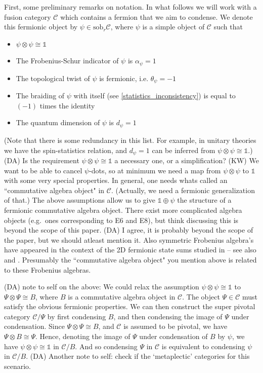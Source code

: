 \documentclass[12pt,a4paper]{article}
\newcommand{\tp}{\otimes}
\newcommand{\unit}{\mathds{1}}
\newcommand{\mcc}{\mathcal{C}}
\newcommand{\sob}{\text{sob}_r}
\newcommand{\ot}{\otimes}
\newcommand{\kw}[1]{{\color{kwcolor}\footnotesize{(KW) #1}}}
\newcommand{\dave}[1]{{\color{ao(english)}\footnotesize{(DA) #1}}}
\begin{document}
First, some preliminary remarks on notation. 
In what follows we will work with a fusion category $\mathcal{C}$ which contains a fermion that we aim to condense. 
We denote this fermionic object by $\psi \in \sob\mcc$, 
where $\psi$ is a simple object of $\mcc$ such that
\begin{itemize} 
	\item $\psi\ot\psi\cong\unit$
	\item The Frobenius-Schur indicator of $\psi$ is $\alpha_\psi =1$
	\item The topological twist of $\psi$ is fermionic, i.e. $\theta_\psi =-1$
	\item The braiding of $\psi$ with itself (see \eqref{statistics_inconsistency}) is equal to $(-1)$ times the identity
	\item The quantum dimension of $\psi$ is $d_\psi=1$
\end{itemize}
(Note that there is some redundancy in this list.
For example, 
in unitary theories we have the spin-statistics relation, and $d_\psi=1$ can be inferred from $\psi\tp\psi \cong \unit$.)
\dave{Is the requirement $\psi \tp \psi \cong \unit$ a necessary one, or a simplification?}
\kw{We want to be able to cancel $\psi$-dots, so at minimum we need a map from $\psi\tp\psi$ to $\unit$ with some very special properties.
In general, one needs whats called an ``commutative algebra object" in $\mcc$.
(Actually, we need a fermionic generalization of that.)
The above assumptions allow us to give $\unit\oplus\psi$ the structure of a fermionic commutative algebra object.
There exist more complicated algebra objects (e.g.\ ones corresponding to E6 and E8),
but think discussing this is beyond the scope of this paper.}
\dave{
I agree, it is probably beyond the scope of the paper, but we should atleast mention it.
Also symmetric Frobenius algebra's have appeared in the context of the 2D fermionic state sums studied in \cite{turzillo2016} -- see also \cite{novak2015b} and \cite{Novak2015,Barrett2015}.
Presumably the ``commutative algebra object" you mention above is related to these Frobenius algebras.
}

\dave{note to self on the above: 
We could relax the assumption $\psi \tp \psi \cong \unit$ to $\Psi \tp \Psi \cong B$, 
where $B$ is a commutative algebra object in $\mcc$. 
The object $\Psi \in \mcc $ must satisfy the obvious fermionic properties.
We can then construct the super pivotal category $\mcc/\Psi$ by first condensing $B$, and then condensing the image of $\Psi$ under condensation.
Since $\Psi \tp \Psi \cong B$, and $\mcc$ is assumed to be pivotal, we have $\Psi \tp B \cong \Psi$. 
Hence, denoting the image of $\Psi$ under condensation of $B$ by $\psi$, 
we have $\psi \tp \psi \cong \unit$ in $\mcc/B$.
And so condensing $\Psi$ in $\mcc$ is equivalent to condensing $\psi$ in $\mcc/B$.
}
\dave{Another note to self: check if the `metaplectic' categories for this scenario.}
\end{document}
